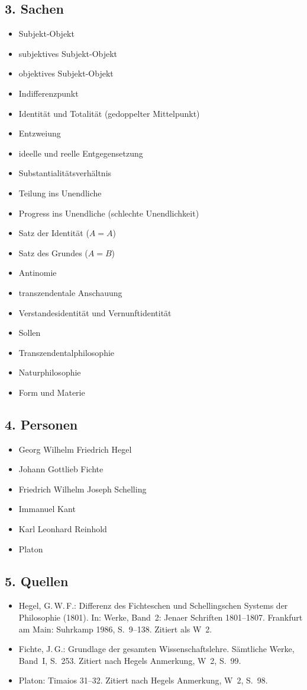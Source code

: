 \documentclass[11pt,a4paper]{article}
\newcommand{\SO}{Subjekt-Objekt}
\begin{document}
\subsection*{3. Sachen}
\begin{itemize}
\item \SO{}
\item subjektives \SO{}
\item objektives \SO{}
\item Indifferenzpunkt
\item Identität und Totalität (gedoppelter Mittelpunkt)
\item Entzweiung
\item ideelle und reelle Entgegensetzung
\item Substantialitätsverhältnis
\item Teilung ins Unendliche
\item Progress ins Unendliche (schlechte Unendlichkeit)
\item Satz der Identität ($A = A$)
\item Satz des Grundes ($A = B$)
\item Antinomie
\item transzendentale Anschauung
\item Verstandesidentität und Vernunftidentität
\item Sollen
\item Transzendentalphilosophie
\item Naturphilosophie
\item Form und Materie
\end{itemize}

\subsection*{4. Personen}
\begin{itemize}
\item Georg Wilhelm Friedrich Hegel
\item Johann Gottlieb Fichte
\item Friedrich Wilhelm Joseph Schelling
\item Immanuel Kant
\item Karl Leonhard Reinhold
\item Platon
\end{itemize}

\subsection*{5. Quellen}
\begin{itemize}
\item Hegel, G.\,W.\,F.: Differenz des Fichteschen und Schellingschen Systems der Philosophie (1801). In: Werke, Band~2: Jenaer Schriften 1801--1807. Frankfurt am Main: Suhrkamp 1986, S.~9--138. Zitiert als W~2.
\item Fichte, J.\,G.: Grundlage der gesamten Wissenschaftslehre. Sämtliche Werke, Band~I, S.~253. Zitiert nach Hegels Anmerkung, W~2, S.~99.
\item Platon: Timaios 31--32. Zitiert nach Hegels Anmerkung, W~2, S.~98.
\end{itemize}
\end{document}
